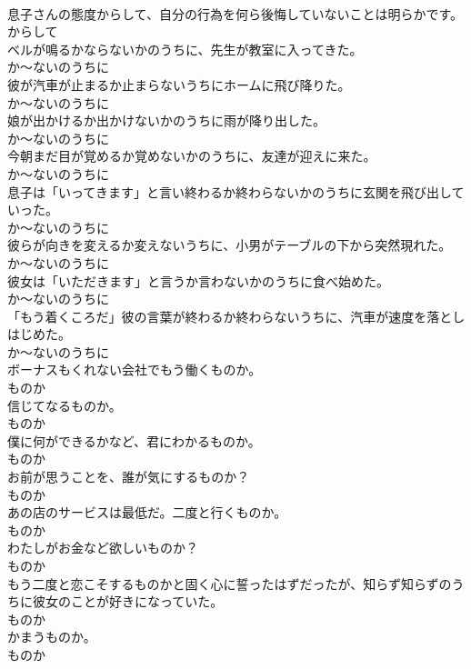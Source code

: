 \documentclass[8pt]{extreport}
\begin{document}
\begin{CJK}{UTF8}{min}
\\	息子さんの態度からして、自分の行為を何ら後悔していないことは明らかです。	
\\	からして
\\	ベルが鳴るかならないかのうちに、先生が教室に入ってきた。	
\\	か～ないのうちに
\\	彼が汽車が止まるか止まらないうちにホームに飛び降りた。	
\\	か～ないのうちに
\\	娘が出かけるか出かけないかのうちに雨が降り出した。	
\\	か～ないのうちに
\\	今朝まだ目が覚めるか覚めないかのうちに、友達が迎えに来た。	
\\	か～ないのうちに
\\	息子は「いってきます」と言い終わるか終わらないかのうちに玄関を飛び出していった。	
\\	か～ないのうちに
\\	彼らが向きを変えるか変えないうちに、小男がテーブルの下から突然現れた。	
\\	か～ないのうちに
\\	彼女は「いただきます」と言うか言わないかのうちに食べ始めた。	
\\	か～ないのうちに
\\	「もう着くころだ」彼の言葉が終わるか終わらないうちに、汽車が速度を落としはじめた。	
\\	か～ないのうちに
\\	ボーナスもくれない会社でもう働くものか。	
\\	ものか
\\	信じてなるものか。	
\\	ものか
\\	僕に何ができるかなど、君にわかるものか。	
\\	ものか
\\	お前が思うことを、誰が気にするものか？	
\\	ものか
\\	あの店のサービスは最低だ。二度と行くものか。	
\\	ものか
\\	わたしがお金など欲しいものか？	
\\	ものか
\\	もう二度と恋こそするものかと固く心に誓ったはずだったが、知らず知らずのうちに彼女のことが好きになっていた。	
\\	ものか
\\	かまうものか。	
\\	ものか

\end{CJK}
\end{document}
